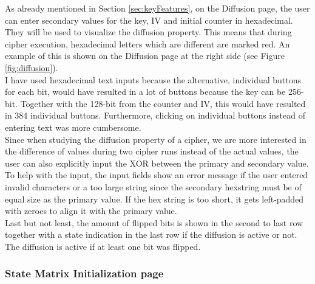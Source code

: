 As already mentioned in Section \ref{sec:keyFeatures}, on the Diffusion page, the user can enter secondary values for the key, IV and initial counter in hexadecimal. They will be used to visualize the diffusion property. This means that during cipher execution, hexadecimal letters which are different are marked red. An example of this is shown on the Diffusion page at the right side (see Figure \ref{fig:diffusion}).\\
I have used hexadecimal text inputs because the alternative, individual buttons for each bit, would have resulted in a lot of buttons because the key can be 256-bit. Together with the 128-bit from the counter and IV, this would have resulted in 384 individual buttons. Furthermore, clicking on individual buttons instead of entering text was more cumbersome. {\color{red} \\
Since when studying the diffusion property of a cipher, we are more interested in the difference of values during two cipher runs instead of the actual values, the user can also explicitly input the XOR between the primary and secondary value.} \\
To help with the input, the input fields show an error message if the user entered invalid characters or a too large string since the secondary hexstring must be of equal size as the primary value. If the hex string is too short, it gets left-padded with zeroes to align it with the primary value. \\
Last but not least, the amount of flipped bits is shown in the second to last row together with a state indication in the last row if the diffusion is active or not. The diffusion is active if at least one bit was flipped.

\subsubsection{State Matrix Initialization page}

